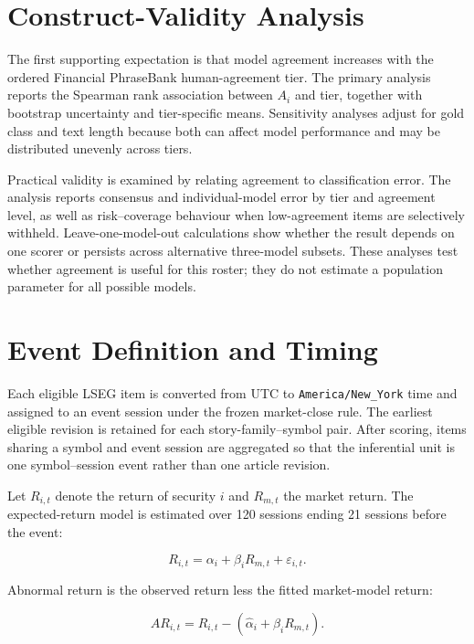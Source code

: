 \documentclass[11pt,a4paper,oneside]{book}
\begin{document}
\section{Construct-Validity Analysis}
\label{sec:method-validity}

The first supporting expectation is that model agreement increases with the ordered Financial PhraseBank human-agreement tier.
The primary analysis reports the Spearman rank association between $A_i$ and tier, together with bootstrap uncertainty and tier-specific means.
Sensitivity analyses adjust for gold class and text length because both can affect model performance and may be distributed unevenly across tiers.

Practical validity is examined by relating agreement to classification error.
The analysis reports consensus and individual-model error by tier and agreement level, as well as risk--coverage behaviour when low-agreement items are selectively withheld.
Leave-one-model-out calculations show whether the result depends on one scorer or persists across alternative three-model subsets.
These analyses test whether agreement is useful for this roster; they do not estimate a population parameter for all possible models.

\section{Event Definition and Timing}
\label{sec:method-events}

Each eligible LSEG item is converted from UTC to \texttt{America/New\_York} time and assigned to an event session under the frozen market-close rule.
The earliest eligible revision is retained for each story-family--symbol pair.
After scoring, items sharing a symbol and event session are aggregated so that the inferential unit is one symbol--session event rather than one article revision.

Let $R_{i,t}$ denote the return of security $i$ and $R_{m,t}$ the market return.
The expected-return model is estimated over 120 sessions ending 21 sessions before the event:

\begin{equation}
  R_{i,t} = \alpha_i + \beta_i R_{m,t} + \varepsilon_{i,t}.
  \label{eq:market-model}
\end{equation}

Abnormal return is the observed return less the fitted market-model return:

\begin{equation}
  AR_{i,t} = R_{i,t} - \left(\widehat{\alpha}_i + \widehat{\beta}_i R_{m,t}\right).
  \label{eq:abnormal-return}
\end{equation}
\end{document}
